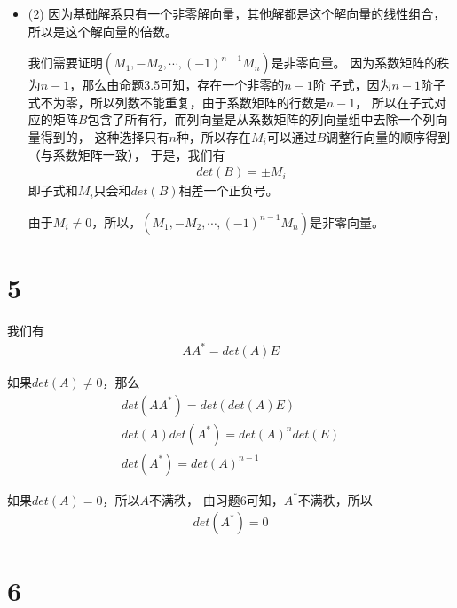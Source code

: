 \documentclass{article}
\begin{document}
\begin{itemize}
  \item (2) 因为基础解系只有一个非零解向量，其他解都是这个解向量的线性组合，
        所以是这个解向量的倍数。

        我们需要证明$(M_1, -M_2, \cdots, (-1)^{n-1}M_n)$是非零向量。
        因为系数矩阵的秩为$n - 1$，那么由命题3.5可知，存在一个非零的$n - 1$阶
        子式，因为$n - 1$阶子式不为零，所以列数不能重复，由于系数矩阵的行数是$n - 1$，
        所以在子式对应的矩阵$B$包含了所有行，而列向量是从系数矩阵的列向量组中去除一个列向量得到的，
        这种选择只有$n$种，所以存在$M_i$可以通过$B$调整行向量的顺序得到（与系数矩阵一致），
        于是，我们有
        \begin{align*}
          det(B) = \pm M_i
        \end{align*}
        即子式和$M_i$只会和$det(B)$相差一个正负号。

        由于$M_i \neq 0$，所以，$(M_1, -M_2, \cdots, (-1)^{n-1}M_n)$是非零向量。

\end{itemize}

\section*{5}


我们有
\begin{align*}
  A A^{*} = det(A) E
\end{align*}

如果$det(A) \neq 0$，那么
\begin{align*}
  det(A A^{*}) = det(det(A) E)        \\
  det(A) det(A^{*}) = det(A)^n det(E) \\
  det(A^{*}) = det(A)^{n - 1}
\end{align*}

如果$det(A) = 0$，所以$A$不满秩，
由习题6可知，$A^{*}$不满秩，所以
\begin{align*}
  det(A^{*}) = 0
\end{align*}

\section*{6}
\end{document}
